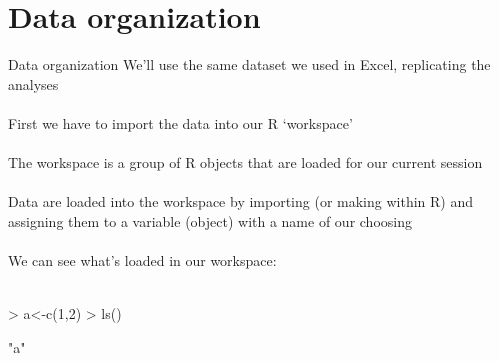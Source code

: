 \documentclass[xcolor=svgnames]{beamer}
\begin{document}
\section{Data organization}

\begin{frame}[fragile]{Data organization}
We'll use the same dataset we used in Excel, replicating the analyses\\~\\
First we have to import the data into our R `workspace' \\~\\
The workspace is a group of R objects that are loaded for our current session \\~\\
Data are loaded into the workspace by importing (or making within R) and assigning them to a variable (object) with a name of our choosing\\~\\
We can see what's loaded in our workspace:\\~\\
\begin{Schunk}
\begin{Sinput}
> a<-c(1,2)
> ls()
\end{Sinput}
\begin{Soutput}
[1] "a"
\end{Soutput}
\end{Schunk}
\end{frame}
\end{document}
